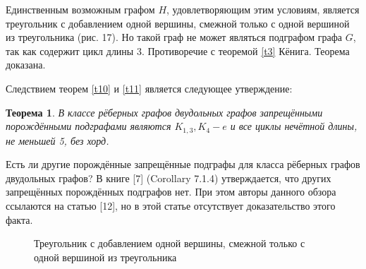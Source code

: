 \documentclass[12pt]{article}
\newtheorem{theorem}{\hspace{1cm}Теорема}
\newtheorem{result}{\hspace{1cm}Следствие}
\begin{document}
	Единственным возможным графом $H$, удовлетворяющим этим условиям, является треугольник с добавлением одной вершины, смежной только с одной вершиной из треугольника (рис. 17). Но такой граф не может являться подграфом графа $G$, так как содержит цикл длины 3. Противоречие с теоремой \ref{t3} Кёнига. Теорема доказана.
	\par
	
	Следствием теорем \ref{t10} и \ref{t11} является следующее утверждение: 
	 
	 \begin{theorem}
	 	\label{t12}
	 В классе рёберных графов двудольных графов запрещёнными порождёнными подграфами являются $K_{1,3}, K_4 - e$ и все циклы нечётной длины, не меньшей 5, без хорд.
	\end{theorem}

Есть ли другие порождённые запрещённые подграфы для класса рёберных графов двудольных графов? В книге [7] (Corollary 7.1.4) утверждается, что других запрещённых порождённых подграфов нет. При этом авторы данного обзора ссылаются на статью [12], но в этой статье отсутствует доказательство этого факта.

	\begin{figure}
	\caption{ Треугольник с добавлением одной вершины, смежной только с одной вершиной из треугольника}
\end{figure}

\newpage
\end{document}
